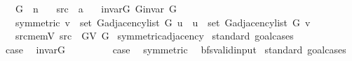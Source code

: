 \begin{isabellebody}
\ \ \ G\ {\isacharcolon}{\kern0pt}{\isacharcolon}{\kern0pt}\ {\isacharprime}{\kern0pt}n\isanewline
\ \ \ src\ {\isacharcolon}{\kern0pt}{\isacharcolon}{\kern0pt}\ {\isacharprime}{\kern0pt}a\isanewline
\ \ \ invar{\isacharunderscore}{\kern0pt}G{\isacharcolon}{\kern0pt}\ {\isachardoublequoteopen}G{\isachardot}{\kern0pt}invar\ G{\isachardoublequoteclose}\isanewline
\ \ \ symmetric{\isacharcolon}{\kern0pt}\ {\isachardoublequoteopen}v\ {\isasymin}\ set\ {\isacharparenleft}{\kern0pt}G{\isachardot}{\kern0pt}adjacency{\isacharunderscore}{\kern0pt}list\ G\ u{\isacharparenright}{\kern0pt}\ {\isasymlongleftrightarrow}\ u\ {\isasymin}\ set\ {\isacharparenleft}{\kern0pt}G{\isachardot}{\kern0pt}adjacency{\isacharunderscore}{\kern0pt}list\ G\ v{\isacharparenright}{\kern0pt}{\isachardoublequoteclose}\isanewline
\ \ \ src{\isacharunderscore}{\kern0pt}mem{\isacharunderscore}{\kern0pt}V{\isacharcolon}{\kern0pt}\ {\isachardoublequoteopen}src\ {\isasymin}\ G{\isachardot}{\kern0pt}V\ G{\isachardoublequoteclose}\isanewline
{}\isanewline
\isanewline
{}\isamarkupfalse%
\ symmetric{\isacharunderscore}{\kern0pt}adjacency\isanewline
%
\isadelimproof
%
\endisadelimproof
%
\isatagproof
{}\isamarkupfalse%
\ {\isacharparenleft}{\kern0pt}standard{\isacharcomma}{\kern0pt}\ goal{\isacharunderscore}{\kern0pt}cases{\isacharparenright}{\kern0pt}\isanewline
\ \ \isamarkupfalse%
\ {}\isanewline
\ \ \isamarkupfalse%
\ {\isacharquery}{\kern0pt}case\ \isamarkupfalse%
\ invar{\isacharunderscore}{\kern0pt}G\ \isacommand{{\isachardot}{\kern0pt}}\isamarkupfalse%
\isanewline
{}\isamarkupfalse%
\isanewline
\ \ \isamarkupfalse%
\ {}\isanewline
\ \ \isamarkupfalse%
\ {\isacharquery}{\kern0pt}case\ \isamarkupfalse%
\ symmetric\ \isacommand{{\isachardot}{\kern0pt}}\isamarkupfalse%
\isanewline
{}\isamarkupfalse%
%
\endisatagproof
{\isafoldproof}%
%
\isadelimproof
\isanewline
%
\endisadelimproof
\isanewline
{}\isamarkupfalse%
\ bfs{\isacharunderscore}{\kern0pt}valid{\isacharunderscore}{\kern0pt}input\isanewline
%
\isadelimproof
%
\endisadelimproof
%
\isatagproof
{}\isamarkupfalse%
\ {\isacharparenleft}{\kern0pt}standard{\isacharcomma}{\kern0pt}\ goal{\isacharunderscore}{\kern0pt}cases{\isacharparenright}{\kern0pt}\isanewline
\ \ \isamarkupfalse%
\ {}\isanewline

\end{isabellebody}
